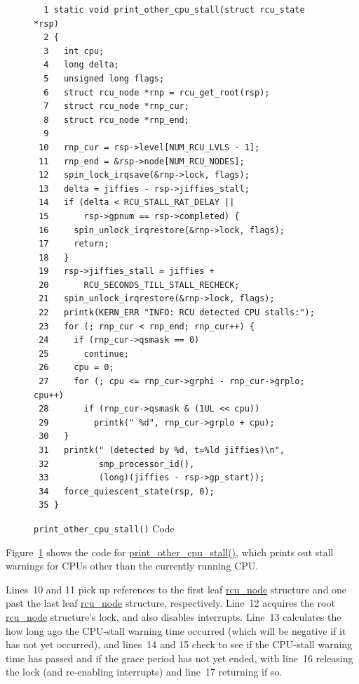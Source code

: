 \begin{figure}[tbp]
{ \scriptsize
\begin{verbatim}
  1 static void print_other_cpu_stall(struct rcu_state *rsp)
  2 {
  3   int cpu;
  4   long delta;
  5   unsigned long flags;
  6   struct rcu_node *rnp = rcu_get_root(rsp);
  7   struct rcu_node *rnp_cur;
  8   struct rcu_node *rnp_end;
  9 
 10   rnp_cur = rsp->level[NUM_RCU_LVLS - 1];
 11   rnp_end = &rsp->node[NUM_RCU_NODES];
 12   spin_lock_irqsave(&rnp->lock, flags);
 13   delta = jiffies - rsp->jiffies_stall;
 14   if (delta < RCU_STALL_RAT_DELAY ||
 15       rsp->gpnum == rsp->completed) {
 16     spin_unlock_irqrestore(&rnp->lock, flags);
 17     return;
 18   }
 19   rsp->jiffies_stall = jiffies +
 20       RCU_SECONDS_TILL_STALL_RECHECK;
 21   spin_unlock_irqrestore(&rnp->lock, flags);
 22   printk(KERN_ERR "INFO: RCU detected CPU stalls:");
 23   for (; rnp_cur < rnp_end; rnp_cur++) {
 24     if (rnp_cur->qsmask == 0)
 25       continue;
 26     cpu = 0;
 27     for (; cpu <= rnp_cur->grphi - rnp_cur->grplo; cpu++)
 28       if (rnp_cur->qsmask & (1UL << cpu))
 29         printk(" %d", rnp_cur->grplo + cpu);
 30   }
 31   printk(" (detected by %d, t=%ld jiffies)\n",
 32          smp_processor_id(),
 33          (long)(jiffies - rsp->gp_start));
 34   force_quiescent_state(rsp, 0);
 35 }
\end{verbatim}
}
\caption{{\tt print\_other\_cpu\_stall()} Code}
\label{fig:app:rcuimpl:rcutreewt:Code for print-other-cpu-stall}
\end{figure}

Figure~\ref{fig:app:rcuimpl:rcutreewt:Code for print-other-cpu-stall}
shows the code for \url{print_other_cpu_stall()}, which prints out
stall warnings for CPUs other than the currently running CPU.

Lines~10 and 11 pick up references to the first leaf \url{rcu_node}
structure and one past the last leaf \url{rcu_node} structure,
respectively.
Line~12 acquires the root \url{rcu_node} structure's lock, and also
disables interrupts.
Line~13 calculates the how long ago the CPU-stall warning time occurred
(which will be negative if it has not yet occurred), and lines~14 and 15
check to see if the CPU-stall warning time has passed and if the
grace period has not yet ended,
with line~16 releasing the lock (and re-enabling interrupts) and
line~17 returning if so.

 \QuickQuizEnd

